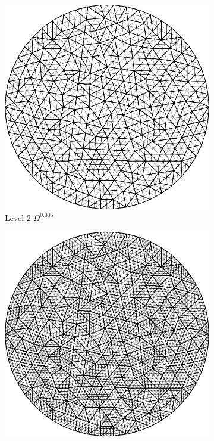 \documentclass{report}
\begin{document}
\begin{figure}[t]
\begin{subfigure}[t]{.23\linewidth}
  \includegraphics[width=1\textwidth]{./Images/M1.png}
   \caption{Level 2 $\Omega^{0.005}$}
 \end{subfigure}\hfill
  \begin{subfigure}[t]{.23\linewidth}
  \includegraphics[width=1\textwidth]{./Images/M2.png}

\end{subfigure}
\end{figure}
\end{document}
